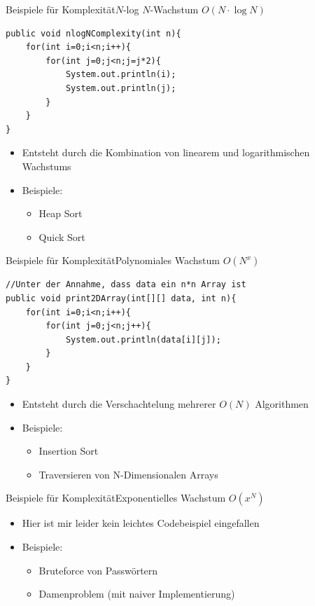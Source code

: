 \begin{frame}[fragile]{Beispiele für Komplexität}{$N$-log $N$-Wachstum $O(N\cdot \log N)$}
\lstset{style=java}
\begin{lstlisting}
public void nlogNComplexity(int n){
    for(int i=0;i<n;i++){
        for(int j=0;j<n;j=j*2){
            System.out.println(i);
            System.out.println(j);
        }
    }
}
\end{lstlisting}
\begin{itemize}
    \item Entsteht durch die Kombination von linearem und logarithmischen Wachstums
    \item Beispiele:
    \begin{itemize}
        \item Heap Sort
        \item Quick Sort
    \end{itemize}
\end{itemize}
\end{frame}

\begin{frame}[fragile]{Beispiele für Komplexität}{Polynomiales Wachstum $O(N^x)$}
\lstset{style=java}
\begin{lstlisting}
//Unter der Annahme, dass data ein n*n Array ist
public void print2DArray(int[][] data, int n){
    for(int i=0;i<n;i++){
        for(int j=0;j<n;j++){
            System.out.println(data[i][j]);
        }
    }
}
\end{lstlisting}
\begin{itemize}
    \item Entsteht durch die Verschachtelung mehrerer $O(N)$ Algorithmen
    \item Beispiele:
    \begin{itemize}
        \item Insertion Sort
        \item Traversieren von N-Dimensionalen Arrays
    \end{itemize}
\end{itemize}
\end{frame}

\begin{frame}{Beispiele für Komplexität}{Exponentielles Wachstum $O(x^N)$}
\begin{itemize}
    \item Hier ist mir leider kein leichtes Codebeispiel eingefallen
    \item Beispiele:
    \begin{itemize}
        \item Bruteforce von Passwörtern 
        \item Damenproblem (mit naiver Implementierung)
    \end{itemize}
\end{itemize}
\end{frame}

